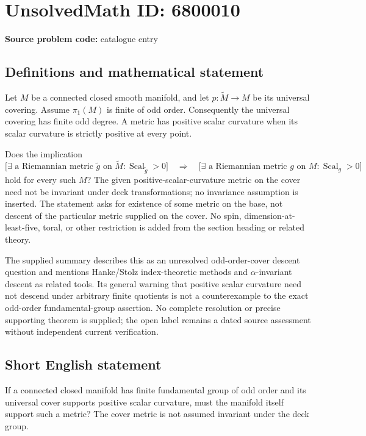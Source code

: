 \documentclass[11pt]{article}
\begin{document}
\section*{UnsolvedMath ID: 6800010}
\textbf{Source problem code:} catalogue entry
\subsection{Definitions and mathematical statement}
Let \(M\) be a connected closed smooth manifold, and let \(p:\widetilde M\to M\) be its universal covering. Assume \(\pi_1(M)\) is finite of odd order. Consequently the universal covering has finite odd degree. A metric has positive scalar curvature when its scalar curvature is strictly positive at every point.

Does the implication
\[
 \bigl[\exists\text{ a Riemannian metric }\widetilde g\text{ on }\widetilde M:
 \operatorname{Scal}_{\widetilde g}>0\bigr]
 \quad\Longrightarrow\quad
 \bigl[\exists\text{ a Riemannian metric }g\text{ on }M:
 \operatorname{Scal}_g>0\bigr]
\]
hold for every such \(M\)? The given positive-scalar-curvature metric on the cover need not be invariant under deck transformations; no invariance assumption is inserted. The statement asks for existence of some metric on the base, not descent of the particular metric supplied on the cover. No spin, dimension-at-least-five, toral, or other restriction is added from the section heading or related theory.

The supplied summary describes this as an unresolved odd-order-cover descent question and mentions Hanke/Stolz index-theoretic methods and \(\alpha\)-invariant descent as related tools. Its general warning that positive scalar curvature need not descend under arbitrary finite quotients is not a counterexample to the exact odd-order fundamental-group assertion. No complete resolution or precise supporting theorem is supplied; the open label remains a dated source assessment without independent current verification.
\subsection{Short English statement}
If a connected closed manifold has finite fundamental group of odd order and its universal cover supports positive scalar curvature, must the manifold itself support such a metric? The cover metric is not assumed invariant under the deck group.
\end{document}
